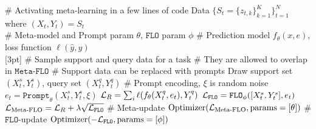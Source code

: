 \documentclass[nohyperref]{article}
\theoremstyle{plain}
\theoremstyle{definition}
\theoremstyle{remark}
\newcommand{\FLO}{\texttt{FLO}}
\newcommand{\Prompt}{\texttt{Prompt}}
\newcommand{\metaflo}{\texttt{Meta-FLO} }
\begin{document}
\begin{algorithm}[t!]
\caption{$\metaflo$}
   \label{alg:metaflo}
\begin{algorithmic}
\STATE \# Activating meta-learning in a few lines of code
\STATE Data $\{ S_t = \{ z_{t,k} \}_{k=1}^K \}_{t=1}^N$ where $(X_{t}, Y_{t}) = S_t$\\
\STATE \# Meta-model and Prompt param $\theta$,  $\FLO$ param $\phi$
\STATE \# Prediction model $f_{\theta}(x, e)$, loss function $\ell(\hat{y}, y)$\\
[3pt]
\STATE \# Sample support and query data for a task
\STATE \# They are allowed to overlap in $\metaflo$
\STATE \# Support data can be replaced with prompts
\STATE Draw support set $(X_t^s, Y_t^s)$, query set $(X_t^q, Y_t^q)$ %
\STATE \# Prompt encoding, $\xi$ is random noise
\STATE $e_t = \Prompt_{\theta}(X_t^s, Y_t^s, \xi)$ 
\STATE $\mathcal{L}_R = \sum_i \ell(f_{\theta}(X_t^q, e_t), Y_t^q)$
\STATE $\CL_{\FLO} = \FLO_{\phi}([X_t^s, Y_t^s], e_t)$
\STATE $\CL_{\text{Meta-FLO}} = \CL_R + \lambda \sqrt{\CL_{\FLO}}$
\STATE \# Meta-update
\STATE $\text{Optimizer}(\mathcal{L}_{\text{Meta-FLO}} , \text{params}=[\theta])$
\STATE \# $\FLO$-update
\STATE $\text{Optimizer}(-\CL_{\FLO}, \text{params}=[\phi])$

\end{algorithmic}
\end{algorithm}
\end{document}
